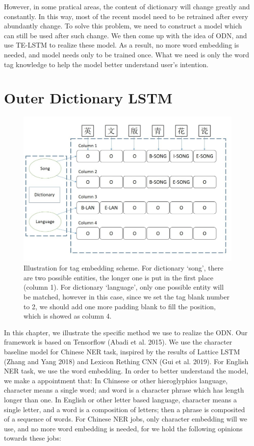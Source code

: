 \documentclass[letterpaper]{article} %
\begin{document}
However, in some pratical areas, the content of dictionary will change greatly and constantly. In this way, most of the recent model need to be retrained after every abundantly change. To solve this problem, we need to construct a model which can still be used after such change. We then come up with the idea of ODN, and use TE-LSTM to realize these model. As a result, no more word embedding is needed, and model needs only to be trained once.  What we need is only the word tag knowledge to help the model better understand user's intention.

\section{Outer Dictionary LSTM}


\begin{figure}[t]
\centering
\includegraphics[width=0.9\columnwidth]{tag_scheme} %
\caption{Illustration for tag embedding scheme. For dictionary `song', there are two possible entities, the longer one is put in the first place (column 1). For dictionary `language', only one possible entity will be matched, however in this case, since we set the tag blank number to 2, we should add one more padding blank to fill the position, which is showed as column 4. }
\label{tag_scheme}
\end{figure}

In this chapter, we illustrate the specific method we use to realize the ODN. Our framework is based on Tensorflow (Abadi et al. 2015). We use the character baseline model for Chinese NER task,  inspired by the results of Lattice LSTM (Zhang and Yang 2018) and Lexicon Rething CNN (Gui et al. 2019). For English NER task, we use the word embedding. In order to better understand the model, we make a appointment that: In Chinsese or other hieroglyphics language, character means a single word; and word is a character phrase which has length longer than one. In English or other letter based language, character means a single letter, and a word is a composition of letters; then a phrase is composited of a sequence of words. For Chinese NER jobs, only character embedding will we use, and no more word embedding is needed, for we hold the following opinions towards these jobs:
\end{document}
